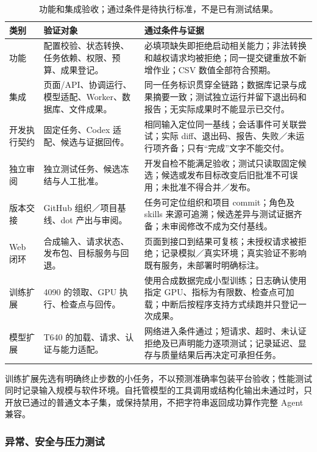 \documentclass[11pt,a4paper]{article}
\begin{document}
\begin{table}[H]
\centering\small\renewcommand{\arraystretch}{1.18}
\begin{tabularx}{\textwidth}{P{1.6cm}P{3.2cm}L}
\toprule
\textbf{类别} & \textbf{验证对象} & \textbf{通过条件与证据}\\
\midrule
功能 & 配置校验、状态转换、任务依赖、权限、预算、成果登记。 & 必填项缺失即拒绝启动相关能力；非法转换和越权请求均被拒绝；同一提交键重放不新增作业；CSV 数值全部符合预期。\\
集成 & 页面/API、协调运行、模型适配、Worker、数据库、文件成果。 & 同一任务标识贯穿全链路；数据库记录与成果摘要一致；测试独立运行并留下退出码和报告；无实际成果时不能显示已交付。\\
开发执行契约 & 固定任务、Codex 适配、候选与证据回传。 & 相同输入定位同一基线；会话事件可关联尝试；实际 diff、退出码、报告、失败／未运行项齐备；只有“完成”文字不能交付。\\
独立审阅 & 独立测试任务、候选冻结与人工批准。 & 开发自检不能满足验收；测试只读取固定候选；候选或发布目标改变后旧批准不可误用；未批准不得合并／发布。\\
版本交接 & GitHub 组织／项目基线、dot 产出与审阅。 & 任务可定位组织和项目 commit；角色及 skills 来源可追溯；候选差异与测试证据齐备；未审阅修改不成为交付基线。\\
Web 闭环 & 合成输入、请求状态、发布包、目标服务与回退。 & 页面到接口到结果可复核；未授权请求被拒绝；记录模拟／真实环境；真实验证不影响既有服务，未部署时明确标注。\\
训练扩展 & 4090 的领取、GPU 执行、检查点与回传。 & 使用合成数据完成小型训练；日志确认使用指定 GPU、指标为有限数、检查点可加载；中断后按程序支持方式续跑并只登记一次成果。\\
模型扩展 & T640 的加载、请求、认证与能力适配。 & 网络进入条件通过；短请求、超时、未认证拒绝及已声明能力逐项测试；记录延迟、显存与质量结果后再决定可承担任务。\\
\bottomrule
\end{tabularx}
\caption{功能和集成验收；通过条件是待执行标准，不是已有测试结果。}
\end{table}

训练扩展先选有明确终止步数的小任务，不以预测准确率包装平台验收；性能测试同时记录输入规模与软件环境。自托管模型的工具调用或结构化输出未通过时，只开放已通过的普通文本子集，或保持禁用，不把字符串返回成功算作完整 Agent 兼容。

\subsubsection{异常、安全与压力测试}
\end{document}
